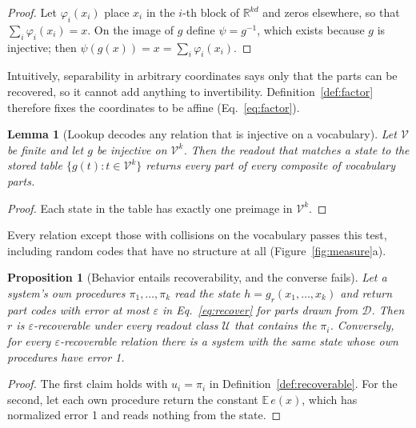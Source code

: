 \documentclass[10pt]{article}
\theoremstyle{plain}
\newtheorem{proposition}{Proposition}
\newtheorem{lemma}{Lemma}
\theoremstyle{remark}
\newcommand{\R}{\mathbb{R}}
\newcommand{\U}{\mathcal{U}}
\newcommand{\D}{\mathcal{D}}
\newcommand{\Voc}{\mathcal{V}}
\begin{document}
\begin{proof}
Let $\varphi_i(x_i)$ place $x_i$ in the $i$-th block of $\R^{kd}$ and zeros elsewhere, so that $\sum_i \varphi_i(x_i) = x$. On the image of $g$ define $\psi = g^{-1}$, which exists because $g$ is injective; then $\psi(g(x)) = x = \sum_i \varphi_i(x_i)$.
\end{proof}

\noindent
Intuitively, separability in arbitrary coordinates says only that the parts can be recovered, so it cannot add anything to invertibility. Definition~\ref{def:factor} therefore fixes the coordinates to be affine (Eq.~\ref{eq:factor}).

\begin{lemma}[Lookup decodes any relation that is injective on a vocabulary]
\label{lem:lookup}
Let $\Voc$ be finite and let $g$ be injective on $\Voc^k$. Then the readout that matches a state to the stored table $\{g(t) : t \in \Voc^k\}$ returns every part of every composite of vocabulary parts.
\end{lemma}

\begin{proof}
Each state in the table has exactly one preimage in $\Voc^k$.
\end{proof}

\noindent
Every relation except those with collisions on the vocabulary passes this test, including random codes that have no structure at all (Figure~\ref{fig:measure}a).



\begin{proposition}[Behavior entails recoverability, and the converse fails]
\label{prop:subset}
Let a system's own procedures $\pi_1, \ldots, \pi_k$ read the state $h = g_r(x_1, \ldots, x_k)$ and return part codes with error at most $\varepsilon$ in Eq.~\eqref{eq:recover} for parts drawn from $\D$. Then $r$ is $\varepsilon$-recoverable under every readout class $\U$ that contains the $\pi_i$. Conversely, for every $\varepsilon$-recoverable relation there is a system with the same state whose own procedures have error 1.
\end{proposition}

\begin{proof}
The first claim holds with $u_i = \pi_i$ in Definition~\ref{def:recoverable}. For the second, let each own procedure return the constant $\mathbb{E}\,e(x)$, which has normalized error 1 and reads nothing from the state.
\end{proof}
\end{document}
